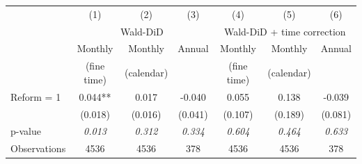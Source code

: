 \begin{tabular}{lcccccc}
 & (1) & (2) & (3) & (4) & (5) & (6) \\
 & \multicolumn{3}{c}{Wald-DiD} & \multicolumn{3}{c}{Wald-DiD + time correction} \\
 & Monthly & Monthly & Annual & Monthly & Monthly & Annual \\
 & (fine time) & (calendar) & & (fine time) & (calendar) & \\
Reform = 1 & 0.044** & 0.017 & -0.040 & 0.055 & 0.138 & -0.039 \\
 & (0.018) & (0.016) & (0.041) & (0.107) & (0.189) & (0.081) \\
p-value & \textit{0.013} & \textit{0.312} & \textit{0.334} & \textit{0.604} & \textit{0.464} & \textit{0.633} \\
Observations & 4536 & 4536 & 378 & 4536 & 4536 & 378 \\
\end{tabular}
